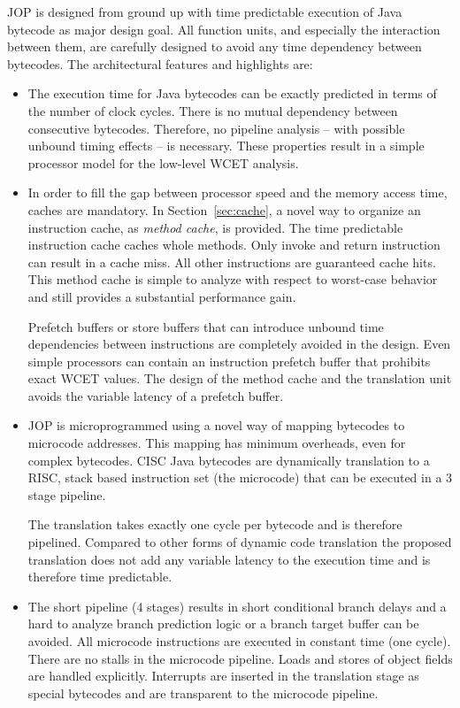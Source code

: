 JOP is designed from ground up with time predictable execution of
Java bytecode as major design goal. All function units, and
especially the interaction between them, are carefully designed to
avoid any time dependency between bytecodes. The architectural
features and highlights are:

\begin{itemize}

    \item
The execution time for Java bytecodes can be exactly predicted in
terms of the number of clock cycles. There is no mutual dependency
between consecutive bytecodes. Therefore, no pipeline analysis --
with possible unbound timing effects -- is necessary. These
properties result in a simple processor model for the low-level WCET
analysis.

    \item
In order to fill the gap between processor speed and the memory
access time, caches are mandatory. In Section~\ref{sec:cache}, a
novel way to organize an instruction cache, as \emph{method cache},
is provided. The time predictable instruction cache caches whole
methods. Only invoke and return instruction can result in a cache
miss. All other instructions are guaranteed cache hits. This method
cache is simple to analyze with respect to worst-case behavior and
still provides a substantial performance gain.


Prefetch buffers or store buffers that can introduce unbound time
dependencies between instructions are completely avoided in the
design. Even simple processors can contain an instruction prefetch
buffer that prohibits exact WCET values. The design of the method
cache and the translation unit avoids the variable latency of a
prefetch buffer.



    \item
JOP is microprogrammed using a novel way of mapping bytecodes to
microcode addresses. This mapping has minimum overheads, even for
complex bytecodes. CISC Java bytecodes are dynamically translation
to a RISC, stack based instruction set (the microcode) that can be
executed in a 3 stage pipeline.


The translation takes exactly one cycle per bytecode and is
therefore pipelined. Compared to other forms of dynamic code
translation the proposed translation does not add any variable
latency to the execution time and is therefore time predictable.

    \item
The short pipeline (4 stages) results in short conditional branch
delays and a hard to analyze branch prediction logic or a branch
target buffer can be avoided. All microcode instructions are
executed in constant time (one cycle). There are no stalls in the
microcode pipeline. Loads and stores of object fields are handled
explicitly. Interrupts are inserted in the translation stage as
special bytecodes and are transparent to the microcode pipeline.



\end{itemize}
